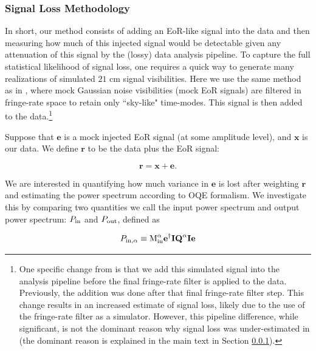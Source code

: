 \documentclass[preprint2,numberedappendix,tighten]{aastex6}  %
\begin{document}
\subsubsection{Signal Loss Methodology} 
\label{sec:siglossmethod}
In short, our method consists of adding an EoR-like signal into the data and then measuring how much of this injected signal would be detectable given any attenuation of this signal by the (lossy) data analysis pipeline.  To capture the full statistical likelihood of signal loss, one requires a quick way to generate many realizations of simulated $21$ 
cm signal visibilities. Here we use the same method as in , where mock Gaussian noise visibilities (mock EoR signals) 
are filtered in fringe-rate space to retain only ``sky-like" time-modes. This signal is then added to the data.\footnote{One 
specific change from  is that we add this simulated signal into the analysis pipeline before the final fringe-rate filter is 
applied to the data. Previously, the addition was done after that final fringe-rate filter step.  This change results in an increased 
estimate of signal loss, %
likely due to the use of the fringe-rate filter as a simulator. However, this pipeline difference, while significant, is not the dominant reason why signal loss was under-estimated in  (the dominant reason is explained in the main text in Section \ref{sec:siglossmethod}).}

Suppose that $\textbf{e}$ is a mock injected EoR signal (at some amplitude level), and $\textbf{x}$ is our data. We define $\textbf{r}
$ to be the data plus the EoR signal:

\begin{equation}
\label{eq:rxe}
\textbf{r} = \textbf{x} + \textbf{e}.
\end{equation}

We are interested in quantifying how much variance in $\textbf{e}$ is lost after weighting $\textbf{r}$ and estimating the power 
spectrum according to OQE formalism. We investigate this by comparing two quantities we call the input power spectrum and 
output power spectrum: $P_{\rm in}$ and $P_{\rm out}$, defined as

\begin{equation}
\label{eq:Pin}
P_{\rm in,\alpha} \equiv \text{M}^{\alpha}_{\rm in}\textbf{e}^{\dagger}\textbf{I}\textbf{Q}^{\alpha}\textbf{I}\textbf{e}
\end{equation}
\end{document}

